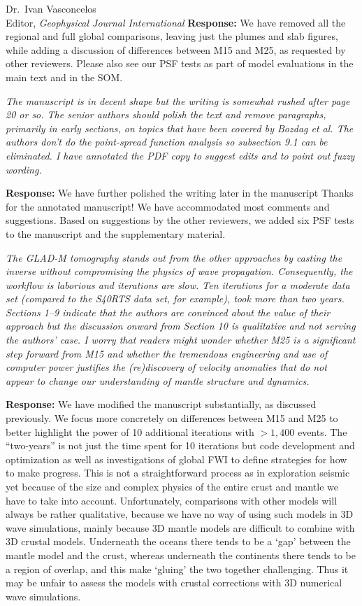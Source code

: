 \documentclass[11pt,a4paper]{letter}
\newcommand{\response}[1]{\textbf{Response:} #1}
\newcommand{\rev}[1]{{\it{#1}}}
\begin{document}
\begin{letter}{Dr.~Ivan Vasconcelos\\
Editor, \textit{Geophysical Journal International}}
\response{We have removed all the regional and full global comparisons, leaving just the plumes and slab figures, while adding a discussion of differences between M15 and M25, as requested by other reviewers. Please also see our PSF tests as part of model evaluations in the main text and in the SOM.}

\rev{The manuscript is in decent shape but the writing is somewhat rushed after page 20 or so. The senior authors should polish the text and remove paragraphs, primarily in early sections, on topics that have been covered by Bozdag et al.
The authors don't do the point-spread function analysis so subsection 9.1 can be eliminated. I have annotated the PDF copy to suggest edits and to point out fuzzy wording.
}

\response{We have further polished the writing later in the manuscript
Thanks for the annotated manuscript! We have accommodated most comments and suggestions.
Based on suggestions by the other reviewers,
we added six PSF tests to the manuscript and the supplementary material.}

\rev{The GLAD-M tomography stands out from the other approaches by casting the inverse without compromising the physics of wave propagation. Consequently, the workflow is laborious and iterations are slow. Ten iterations for a moderate data set (compared to the S40RTS data set, for example), took more than two years. Sections 1--9 indicate that the authors are convinced about the value of their approach but the discussion onward from Section 10 is qualitative and not serving the authors' case.
I worry that readers might wonder whether M25 is a significant step forward from M15 and whether the tremendous engineering and use of computer power justifies the (re)discovery of velocity anomalies that do not appear to change our understanding of mantle structure and dynamics.
}

\response{We have modified the manuscript substantially, as discussed previously. We focus more concretely on differences between M15 and M25 to better highlight the power of 10 additional iterations with $>1,400$ events. The ``two-years'' is not just the time spent for 10 iterations but code development and optimization as well as investigations of global FWI to define strategies for how to make progress. This is not a straightforward process as in exploration seismic yet because of the size and complex physics of the entire crust and mantle we have to take into account.
Unfortunately,
comparisons with other models will always be rather qualitative, because we have no way of using such models in 3D wave simulations, mainly because 3D mantle models are difficult to combine with 3D crustal models. Underneath the oceans there tends to be a `gap' between the mantle model and the crust, whereas underneath the continents there tends to be a region of overlap, and this make `gluing' the two together challenging. Thus it may be unfair to assess the models with crustal corrections with 3D numerical wave simulations.}


\end{letter}
\end{document}
